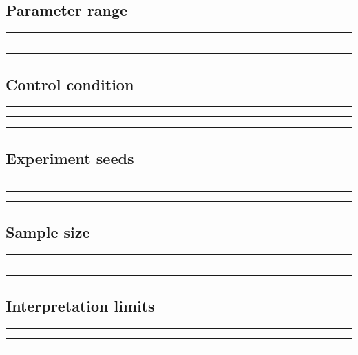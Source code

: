 \documentclass[11pt]{article}
\begin{document}
\subsection{Parameter range}
\noindent\rule{\linewidth}{0.3pt}\par\vspace{0.18in}
\noindent\rule{\linewidth}{0.3pt}\par\vspace{0.18in}
\noindent\rule{\linewidth}{0.3pt}\par\vspace{0.14in}

\subsection{Control condition}
\noindent\rule{\linewidth}{0.3pt}\par\vspace{0.18in}
\noindent\rule{\linewidth}{0.3pt}\par\vspace{0.18in}
\noindent\rule{\linewidth}{0.3pt}\par\vspace{0.14in}

\subsection{Experiment seeds}
\noindent\rule{\linewidth}{0.3pt}\par\vspace{0.18in}
\noindent\rule{\linewidth}{0.3pt}\par\vspace{0.18in}
\noindent\rule{\linewidth}{0.3pt}\par\vspace{0.14in}

\subsection{Sample size}
\noindent\rule{\linewidth}{0.3pt}\par\vspace{0.18in}
\noindent\rule{\linewidth}{0.3pt}\par\vspace{0.18in}
\noindent\rule{\linewidth}{0.3pt}\par\vspace{0.14in}

\subsection{Interpretation limits}
\noindent\rule{\linewidth}{0.3pt}\par\vspace{0.18in}
\noindent\rule{\linewidth}{0.3pt}\par\vspace{0.18in}
\noindent\rule{\linewidth}{0.3pt}\par\vspace{0.14in}
\end{document}

